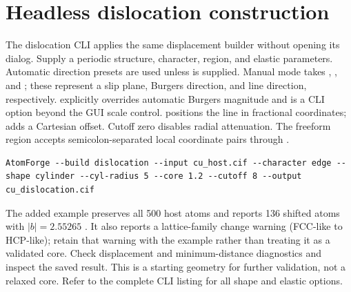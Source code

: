 \section{Headless dislocation construction}
The dislocation CLI applies the same displacement builder without opening its dialog. Supply a periodic structure, character, region, and elastic parameters. Automatic direction presets are used unless  is supplied. Manual mode takes , , and ; these represent a slip plane, Burgers direction, and line direction, respectively.  explicitly overrides automatic Burgers magnitude and is a CLI option beyond the GUI scale control.  positions the line in fractional coordinates;  adds a Cartesian offset. Cutoff zero disables radial attenuation. The freeform region accepts semicolon-separated local coordinate pairs through .
\begin{lstlisting}
AtomForge --build dislocation --input cu_host.cif --character edge --shape cylinder --cyl-radius 5 --core 1.2 --cutoff 8 --output cu_dislocation.cif
\end{lstlisting}
The added example preserves all 500 host atoms and reports 136 shifted atoms with $|b|=2.55265$ \angstrom. It also reports a lattice-family change warning (FCC-like to HCP-like); retain that warning with the example rather than treating it as a validated core. Check displacement and minimum-distance diagnostics and inspect the saved result. This is a starting geometry for further validation, not a relaxed core. Refer to the complete CLI listing for all shape and elastic options.
